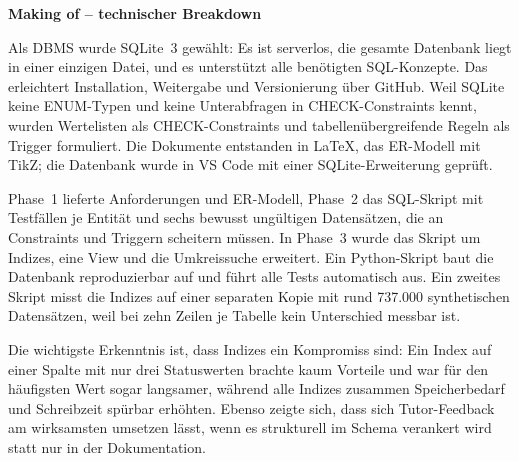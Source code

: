 \documentclass[11pt,a4paper]{article}
\begin{document}
{\fontsize{12}{14}\selectfont\textbf{Making of -- technischer Breakdown}}

Als DBMS wurde SQLite~3 gewählt: Es ist serverlos, die gesamte Datenbank liegt in einer einzigen Datei, und es unterstützt alle benötigten SQL-Konzepte. Das erleichtert Installation, Weitergabe und Versionierung über GitHub. Weil SQLite keine ENUM-Typen und keine Unterabfragen in CHECK-Constraints kennt, wurden Wertelisten als CHECK-Constraints und tabellenübergreifende Regeln als Trigger formuliert. Die Dokumente entstanden in LaTeX, das ER-Modell mit TikZ; die Datenbank wurde in VS Code mit einer SQLite-Erweiterung geprüft.

Phase~1 lieferte Anforderungen und ER-Modell, Phase~2 das SQL-Skript mit Testfällen je Entität und sechs bewusst ungültigen Datensätzen, die an Constraints und Triggern scheitern müssen. In Phase~3 wurde das Skript um Indizes, eine View und die Umkreissuche erweitert. Ein Python-Skript baut die Datenbank reproduzierbar auf und führt alle Tests automatisch aus. Ein zweites Skript misst die Indizes auf einer separaten Kopie mit rund 737.000 synthetischen Datensätzen, weil bei zehn Zeilen je Tabelle kein Unterschied messbar ist.

Die wichtigste Erkenntnis ist, dass Indizes ein Kompromiss sind: Ein Index auf einer Spalte mit nur drei Statuswerten brachte kaum Vorteile und war für den häufigsten Wert sogar langsamer, während alle Indizes zusammen Speicherbedarf und Schreibzeit spürbar erhöhten. Ebenso zeigte sich, dass sich Tutor-Feedback am wirksamsten umsetzen lässt, wenn es strukturell im Schema verankert wird statt nur in der Dokumentation.
\end{document}
